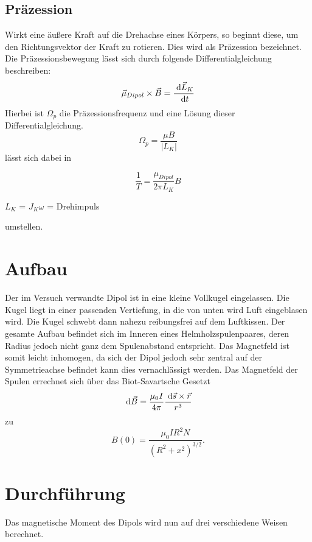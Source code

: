   \subsection{Präzession}
 Wirkt eine äußere Kraft auf die Drehachse eines Körpers, so beginnt diese, um den Richtungsvektor der Kraft zu rotieren. Dies wird als Präzession bezeichnet.
Die Präzessionsbewegung lässt sich durch folgende Differentialgleichung beschreiben:
\begin{equation}
\vec{\mu}_{Dipol} \times \vec{B} = \frac{\; \mathrm{d} \vec{L}_K}{\; \mathrm{d} t}
\end{equation}
Hierbei ist $\Omega_p$ die Präzessionsfrequenz und eine Lösung dieser Differentialgleichung.
\begin{equation}
\Omega_p = \frac{\mu B}{|L_K|}
\end{equation}
lässt sich dabei in
\begin{formel}[H]
\begin{equation}
\frac{1}{T} = \frac{\mu_{Dipol}}{2 \pi L_K} B
\end{equation}
\caption*{\small{$L_K$ = $J_K \omega$ = Drehimpuls}}
\label{prae}
\end{formel}
umstellen.
\section{Aufbau}
Der im Versuch verwandte Dipol ist in eine kleine Vollkugel eingelassen. Die Kugel liegt in einer passenden Vertiefung, in die von unten wird Luft eingeblasen wird. Die Kugel schwebt dann nahezu reibungsfrei auf dem Luftkissen.
Der gesamte Aufbau befindet sich im Inneren eines Helmholzspulenpaares, deren Radius jedoch nicht ganz dem Spulenabstand entspricht. Das Magnetfeld ist somit leicht inhomogen, da sich der Dipol jedoch sehr zentral auf der Symmetrieachse befindet kann dies vernachlässigt werden.
Das Magnetfeld der Spulen errechnet sich über das Biot-Savartsche Gesetzt
\begin{equation}
\; \mathrm{d} \vec{B} = \frac{\mu_0 I}{4\pi} \frac{\; \mathrm{d} \vec{s} \times \vec{r}}{r^3}
\end{equation} 
zu
\begin{equation}
B(0)=\frac{\mu_0 IR^2N}{(R^2+x^2)^{3/2}}.
\label{eqhelm}
\end{equation}

\section{Durchführung}
Das magnetische Moment des Dipols wird nun auf drei verschiedene Weisen berechnet.

